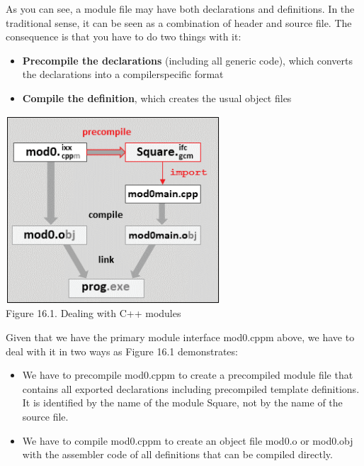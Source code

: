 
As you can see, a module file may have both declarations and definitions. In the traditional sense, it can be seen as a combination of header and source file. The consequence is that you have to do two things with it:

\begin{itemize}
\item 
\textbf{Precompile the declarations} (including all generic code), which converts the declarations into a compilerspecific format

\item 
\textbf{Compile the definition}, which creates the usual object files
\end{itemize}

\begin{center}
\includegraphics[width=0.6\textwidth]{content/chapter16/images/1.png}\\
Figure 16.1. Dealing with C++ modules
\end{center}

Given that we have the primary module interface mod0.cppm above, we have to deal with it in two ways as Figure 16.1 demonstrates:

\begin{itemize}
\item 
We have to precompile mod0.cppm to create a precompiled module file that contains all exported declarations including precompiled template definitions. It is identified by the name of the module Square, not by the name of the source file.

\item
We have to compile mod0.cppm to create an object file mod0.o or mod0.obj with the assembler code of all definitions that can be compiled directly.
\end{itemize}

